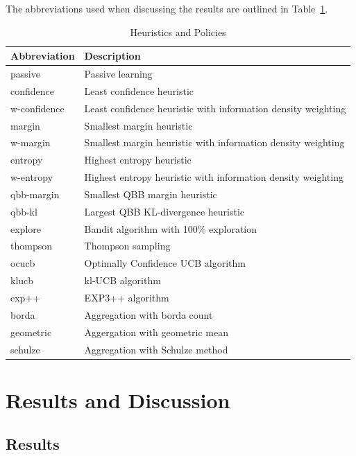 \documentclass[fleqn,10pt,lineno]{wlpeerj} %
\begin{document}
The abbreviations used when discussing the results are outlined in Table~\ref{tab:abbre}.

\begin{table}[htbp]
	\caption {Heuristics and Policies} \label{tab:abbre}
	\centering
	\begin{tabular}{ll}
		\toprule
		{Abbreviation}  & Description \\
		\midrule
        passive
        	& Passive learning \\
		confidence
			& Least confidence heuristic \\
		w-confidence
        	& Least confidence heuristic with information density weighting \\
        margin
        	& Smallest margin heuristic \\
        w-margin
        	& Smallest margin heuristic with information density weighting \\
        entropy
        	& Highest entropy heuristic \\
		w-entropy
        	& Highest entropy heuristic with information density weighting \\
        qbb-margin
        	& Smallest QBB margin heuristic \\
		qbb-kl
        	& Largest QBB KL-divergence heuristic \\
        explore
			& Bandit algorithm with 100\% exploration \\
		thompson
        	& Thompson sampling \\
		ocucb
			& Optimally Confidence UCB algorithm \\
		klucb
			& kl-UCB algorithm \\
		exp++
			& EXP3++ algorithm \\
		borda
			& Aggregation with borda count \\
		geometric
			& Aggergation with geometric mean \\
		schulze
			& Aggregation with Schulze method \\
		\bottomrule
	\end{tabular}
\end{table}

\section{Results and Discussion}\label{sec:discuss}

\subsection{Results}
\end{document}
